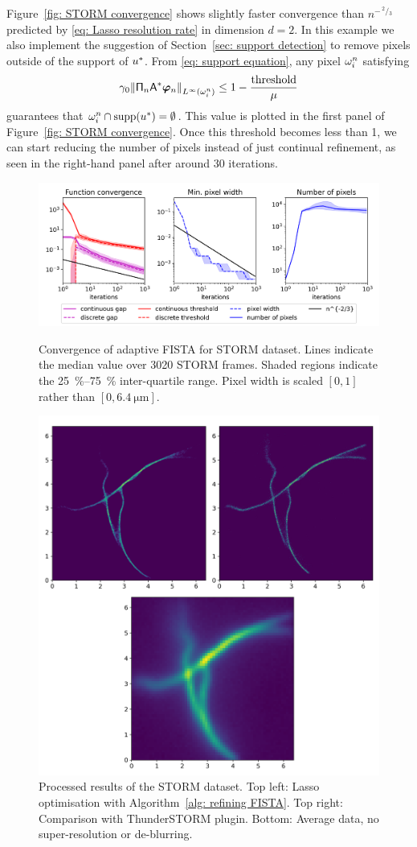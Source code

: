 \documentclass[smallextended]{svjour3}
\newcommand{\norm}[1]{{\left\lVert #1 \right\rVert}}
\renewcommand{\sfrac}[2]{\,^{#1}\!\!/\!_{#2}}
\newcommand{\op}[1]{\operatorname{#1}}
\newcommand{\1}{\F{1}}
\newcommand*{\varf}[1]{%
	\IfEqCase{#1}{%
		{0}{u}%
		{1}{v}%
		{2}{w}%
	}[u#1]%
}
\newcommand*{\vard}[1]{%
	\IfEqCase{#1}{%
		{0}{\varphi}%
		{1}{\psi}%
	}[\varphi #1]%
}
\newcommand*{\vars}[1]{%
	\IfEqCase{#1}{%
		{0}{\alpha}%
		{1}{\beta}%
		{2}{\gamma}%
		{3}{a}%
		{4}{b}%
		{5}{c}%
	}[k#1]%
}
\newcommand*{\vvard}[1]{\vec{\vard{#1}}}
\begin{document}
	Figure~\ref{fig: STORM convergence} shows slightly faster convergence than $n^{-\sfrac23}$ predicted by \eqref{eq: Lasso resolution rate} in dimension $d=2$. In this example we also implement the suggestion of Section~\ref{sec: support detection} to remove pixels outside of the support of $\varf0^*$. From \eqref{eq: support equation}, any pixel $\omega_i^n$ satisfying 
	\begin{equation}
		\vars2_0\norm{\tens{\Pi}_n\A^*\vvard0_n}_{L^\infty(\domain_i^n)} \leq 1-\frac{\op{threshold}}{\mu}
	\end{equation}
	guarantees that $\domain_i^n\cap\op{supp}(\varf0^*) = \emptyset$. This value is plotted in the first panel of Figure~\ref{fig: STORM convergence}. Once this threshold becomes less than 1, we can start reducing the number of pixels instead of just continual refinement, as seen in the right-hand panel after around 30 iterations.
	
	\begin{figure}\centering
		\includegraphics[width=.82\textwidth]{lasso2_convergence}
		\caption{Convergence of adaptive FISTA for STORM dataset. Lines indicate the median value over 3020 STORM frames. Shaded regions indicate the \SIrange{25}{75}{\percent} inter-quartile range. Pixel width is scaled $[0,1]$ rather than $[0,\SI{6.4}{\micro\meter}]$.}\label{fig: STORM convergence}
		
		\vspace*{\floatsep}
		
		\includegraphics[width=.73\textwidth]{STORM_recon}
		\caption{Processed results of the STORM dataset. Top left: Lasso optimisation with Algorithm~\ref{alg: refining FISTA}. Top right: Comparison with ThunderSTORM plugin. Bottom: Average data, no super-resolution or de-blurring.}\label{fig: STORM results}
	\end{figure}
	
\end{document}
